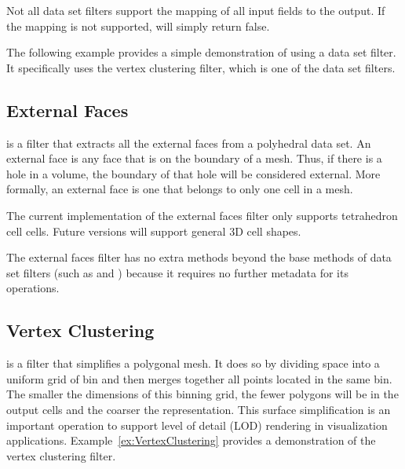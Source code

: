\begin{commonerrors}
  Not all data set filters support the mapping of all input fields to the
  output. If the mapping is not supported, 
  will simply return false.
\end{commonerrors}

The following example provides a simple demonstration of using a data set
filter. It specifically uses the vertex clustering filter, which is one of
the data set filters.


\subsection{External Faces}


 is a filter that extracts all the external faces
from a polyhedral data set. An external face is any face that is on the
boundary of a mesh. Thus, if there is a hole in a volume, the boundary of
that hole will be considered external. More formally, an external face is
one that belongs to only one cell in a mesh.

\begin{commonerrors}
  The current implementation of the external faces filter only supports
  tetrahedron cell cells. Future versions will support general 3D cell
  shapes. 
\end{commonerrors}

The external faces filter has no extra methods beyond the base methods of
data set filters (such as  and
) because it requires no further metadata for
its operations.



\subsection{Vertex Clustering}


 is a filter that simplifies a polygonal mesh.
It does so by dividing space into a uniform grid of bin and then merges
together all points located in the same bin. The smaller the dimensions of
this binning grid, the fewer polygons will be in the output cells and the
coarser the representation. This surface simplification is an important
operation to support level of detail (LOD)
rendering in visualization applications. Example~\ref{ex:VertexClustering}
provides a demonstration of the vertex clustering filter.

